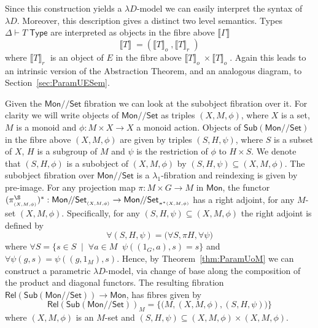 \documentclass[a4paper,UKenglish]{lipics}
\newcommand{\LamOneFib}{$\lambda_1$-fibration\xspace}
\newcommand{\msf}[1]{\mathsf{#1}} %
\newcommand{\Mon}{\msf{Mon}}
\newcommand{\Set}{\msf{Set}}
\newcommand{\Sub}[1]{\msf{Sub}(#1)}
\newcommand{\Rel}{\msf{Rel}}
\newcommand{\GroupSet}[1]{#1/\!/\Set}
\newcommand{\MonSet}{\GroupSet{\Mon}}
\newcommand{\bbracket}[1]{\bigl( #1 \bigr)}
\newcommand{\sem}[1]{\ensuremath{\llbracket #1 \rrbracket} \;}
\newcommand{\semo}[1]{\ensuremath{\llbracket #1 \rrbracket _o} \;}
\newcommand{\semr}[1]{\ensuremath{\llbracket #1 \rrbracket _r} \;}
\newcommand{\UoMtype}{\Delta \vdash T \; \msf{ Type}}
\begin{document}
Since this construction yields a $\lambda D$-model we can easily interpret the syntax of $\lambda D$. Moreover, this description gives a distinct two level semantics. Types $\UoMtype$ are interpreted as objects in the fibre above $\sem{\Gamma}$
\[
 \sem{T} = (\semo{T}, \semr{T})
\]
where $\semr{T}$ is an object of $E$ in the fibre above $\semo{T} \times \semo{T}$. Again this leads to an intrinsic version of the Abstraction Theorem, and an analogous diagram, to Section~\ref{sec:ParamUESem}.



\begin{example}
\label{ex:MonSetParam}
 Given the $\MonSet$ fibration we can look at the subobject fibration over it. For clarity we will write objects of $\MonSet$ as triples $(X,M,\phi)$, where $X$ is a set, $M$ is a monoid and $\phi : M\times X \rightarrow X$ a monoid action. Objects of $\Sub{\MonSet}$ in the fibre above $(X,M,\phi)$ are given by triples $(S,H,\psi)$, where $S$ is a subset of $X$, $H$ is a subgroup of $M$ and $\psi$ is the restriction of $\phi$ to $H\times S$. We denote that $(S,H,\phi)$ is a subobject of $(X,M,\phi)$ by $(S,H,\psi) \subseteq (X,M,\phi)$.
 The subobject fibration over $\MonSet$ is a \LamOneFib and reindexing is given by pre-image. For any projection map $\pi: M\times G \rightarrow M$ in $\Mon$, the functor $(\pi^\S_{_{(X,M,\phi)}})^\ast: \MonSet_{_{(X,M,\phi)}} \rightarrow \MonSet_{_{\pi^\ast (X,M,\phi)}}$ has a right adjoint, for any $M$-set $(X,M,\phi)$. Specifically, for any $(S, H, \psi) \subseteq (X,M,\phi)$ the right adjoint is defined by
 \[
  \forall (S, H, \psi) = \bbracket{ \forall S, \pi H, \forall \psi }
 \]
 where $\forall S = \{ s\in S \; \; | \; \;\forall a\in M \; \; \psi( (1_G, a) , s ) = s  \}$ and $\forall \psi (g,s) = \psi ((g, 1_M),s)$. Hence, by Theorem~\ref{thm:ParamUoM} we can construct a parametric $\lambda D$-model, via change of base along the composition of the product and diagonal functors. The resulting fibration $\Rel(\Sub{\MonSet})\rightarrow \Mon$, has fibres given by
 \[
\Rel(\Sub{\MonSet})_{M} = \{  \bbracket{M, (X,M,\phi), (S,H,\psi)} \}
 \]
where $(X,M,\phi)$ is an $M$-set and $(S,H,\psi)\subseteq (X,M,\phi) \times (X,M,\phi)$.
\end{example}
\end{document}
